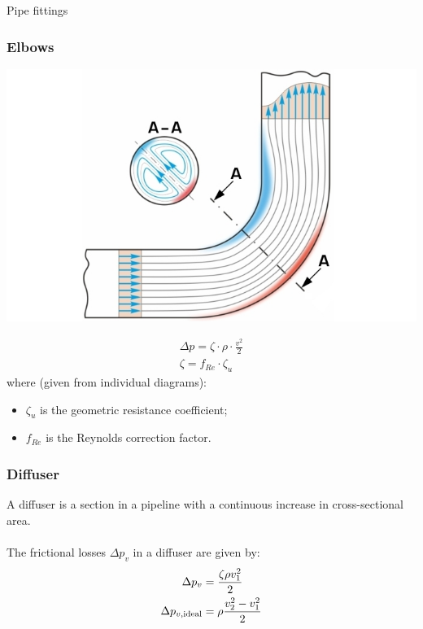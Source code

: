 \documentclass{article}
\begin{document}
\begin{multicols}{2}
\begin{theorybox}{Pipe fittings}
    \subsubsection{Elbows}
    \begin{center}
        \includegraphics[width=.8\textwidth]{media/Sekundärströmung-Rohrkrümmer.jpg}
    \end{center}
    \begin{align}
        \Delta p = \zeta \cdot \rho \cdot\frac{v^2}{2}\\
        \zeta = f_{Re} \cdot \zeta_u
    \end{align}
    where (given from individual diagrams):
    \begin{itemize}
        \item $\zeta_u$ is the geometric resistance coefficient;
        \item $f_{Re}$ is the Reynolds correction factor.
    \end{itemize}
    
    \subsubsection{Diffuser}
    A diffuser is a section in a pipeline with a continuous increase in cross-sectional area.\\\\
    The frictional losses $\Delta p_v$ in a diffuser are given by:
    \begin{align}
        \Delta p_v &= \frac{\zeta\rho v_1^2}{2}\\
        \Delta p_{v,\rm ideal} &= \rho \frac{v_2^2-v_1^2}{2}
    \end{align}
\end{theorybox}
\vfill
\phantom{}
\end{multicols}
\end{document}
